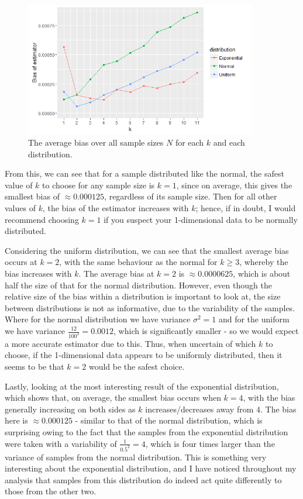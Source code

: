 \documentclass[12pt]{report}
\begin{document}
\begin{figure}
  \begin{center}
    \includegraphics[width=0.9\textwidth]{./Graphs/Best/kVbiasapproxALLN.png}
  \end{center}
\caption{The average bias over all sample sizes $N$ for each $k$ and each distribution.}
  \label{k_bias_allN}
\end{figure}

From this, we can see that for a sample distributed like the normal, the safest value of $k$ to choose for any sample size is $k=1$, since on average, this gives the smallest bias of $\approx 0.000125$, regardless of its sample size. Then for all other values of $k$, the bias of the estimator increases with $k$; hence, if in doubt, I would recommend choosing $k=1$ if you suspect your 1-dimensional data to be normally distributed.

Considering the uniform distribution, we can see that the smallest average bias occurs at $k=2$, with the same behaviour as the normal for $k \geq 3$, whereby the bias increases with $k$. The average bias at $k=2$ is $\approx 0.0000625$, which is about half the size of that for the normal distribution. However, even though the relative size of the bias within a distribution is important to look at, the size between distributions is not as informative, due to the variability of the samples. Where for the normal distribution we have variance $\sigma^2 = 1$ and for the uniform we have variance $\frac{12}{100^2} = 0.0012$, which is significantly smaller - so we would expect a more accurate estimator due to this. Thus, when uncertain of which $k$ to choose, if the 1-dimensional data appears to be uniformly distributed, then it seems to be that $k=2$ would be the safest choice.

Lastly, looking at the most interesting result of the exponential distribution, which shows that, on average, the smallest bias occurs when $k=4$, with the bias generally increasing on both sides as $k$ increases/decreases away from $4$. The bias here is $\approx 0.000125$ - similar to that of the normal distribution, which is surprising owing to the fact that the samples from the exponential distribution were taken with a variability of $\frac{1}{0.5^2} = 4$, which is four times larger than the variance of samples from the normal distribution. This is something very interesting about the exponential distribution, and I have noticed throughout my analysis that samples from this distribution do indeed act quite differently to those from the other two.
\end{document}
